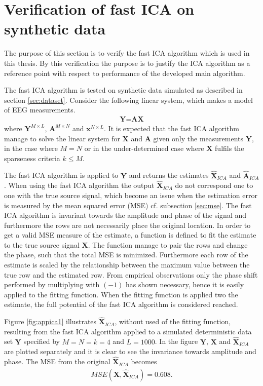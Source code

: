 \section{Verification of fast ICA on synthetic data}
The purpose of this section is to verify the fast ICA algorithm which is used in this thesis. By this verification the purpose is to justify the ICA algorithm as a reference point with respect to performance of the developed main algorithm.

The fast ICA algorithm is tested on synthetic data simulated as described in section \ref{sec:dataset}. 
Consider the following linear system, which makes a model of EEG measurements.  
\begin{align*}
\textbf{Y}=\textbf{AX}
\end{align*}
where $\textbf{Y}^{M\times L}$, $\textbf{A}^{M\times N}$ and $\textbf{x}^{N\times L}$. It is expected that the fast ICA algorithm manage to solve the linear system for $\textbf{X}$ and $\textbf{A}$ given only the measurements $\textbf{Y}$, in the case where $M=N$ or in the under-determined case where $\textbf{X}$ fulfils the sparseness criteria $k \leq M$.  

The fast ICA algorithm is applied to $\textbf{Y}$ and returns the estimates $\hat{\textbf{X}}_{ICA}$ and $\hat{\textbf{A}}_{ICA}$. 
When using the fast ICA algorithm the output $\hat{\textbf{X}}_{ICA}$ do not correspond one to one with the true source signal, which become an issue when the estimation error is measured by the mean squared error (MSE) cf. subsection \ref{sec:mse}.  The fast ICA algorithm is invariant towards the amplitude and phase of the signal and furthermore the rows are not necessarily place the original location. 
In order to get a valid MSE measure of the estimate, a function is defined to fit the estimate to the true source signal $\textbf{X}$. The function manage to pair the rows and change the phase, such that the total MSE is minimized. Furthermore each row of the estimate is scaled by the relationship between the  maximum value between the true row and the estimated row.
From empirical observations only the phase shift performed by multiplying with $(-1)$ has shown necessary, hence it is easily applied to the fitting function.
When the fitting function is applied two the estimate, the full potential of the fast ICA algorithm is considered reached.       

Figure \ref{fig:appica1} illustrates $\hat{\textbf{X}}_{ICA}$, without used of the fitting function, resulting from the fast ICA algorithm applied to a simulated deterministic data set $\textbf{Y}$ specified by $M=N=k=4$ and $L=1000$. In the figure $\textbf{Y}$, $\textbf{X}$ and $\hat{\textbf{X}}_{ICA}$ are plotted separately and it is clear to see the invariance towards amplitude and phase.
The MSE from the original $\hat{\textbf{X}}_{ICA}$ becomes
\begin{align*}
MSE(\textbf{X},\hat{\textbf{X}}_{ICA}) = 0.608.
\end{align*}

